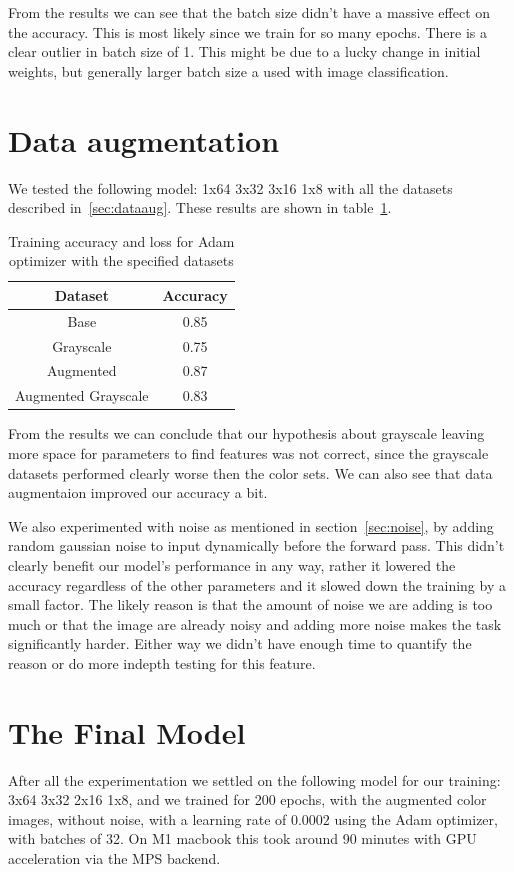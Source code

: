 \documentclass[12pt,a4paper,english
]{tunithesis}
\begin{document}
From the results we can see that the batch size didn't have a massive effect on the accuracy. This is most likely since we train for so many epochs. There is a clear outlier in batch size of 1. This might be due to a lucky change in initial weights, but generally larger batch size a used with image classification.

\section{Data augmentation}
We tested the following model: 1x64 3x32 3x16 1x8 with all the datasets described in~\ref{sec:dataaug}. These results are shown in table~\ref{tab:dataaug}.
\begin{table}[h!]
\centering
\caption{Training accuracy and loss for Adam optimizer with the specified datasets}
\begin{tabular}{|c|c|}
\hline
\textbf{Dataset} & \textbf{Accuracy} \\ \hline
Base & 0.85 \\ \hline
Grayscale & 0.75 \\ \hline
Augmented & 0.87  \\ \hline
Augmented Grayscale & 0.83  \\ \hline
\end{tabular}
\label{tab:dataaug}
\end{table}

From the results we can conclude that our hypothesis about grayscale leaving more space for parameters to find features was not correct, since the grayscale datasets performed clearly worse then the color sets. We can also see that data augmentaion improved our accuracy a bit.

We also experimented with noise as mentioned in section~\ref{sec:noise}, by adding random gaussian noise to input dynamically before the forward pass. This didn't clearly benefit our model's performance in any way, rather it lowered the accuracy regardless of the other parameters and it slowed down the training by a small factor. The likely reason is that the amount of noise we are adding is too much or that the image are already noisy and adding more noise makes the task significantly harder. Either way we didn't have enough time to quantify the reason or do more indepth testing for this feature.

\section{The Final Model}
After all the experimentation we settled on the following model for our training: 3x64 3x32 2x16 1x8, and we trained for 200 epochs, with the augmented color images, without noise, with a learning rate of $0.0002$ using the Adam optimizer, with batches of 32. On M1 macbook this took around 90 minutes with GPU acceleration via the MPS backend.
\end{document}
